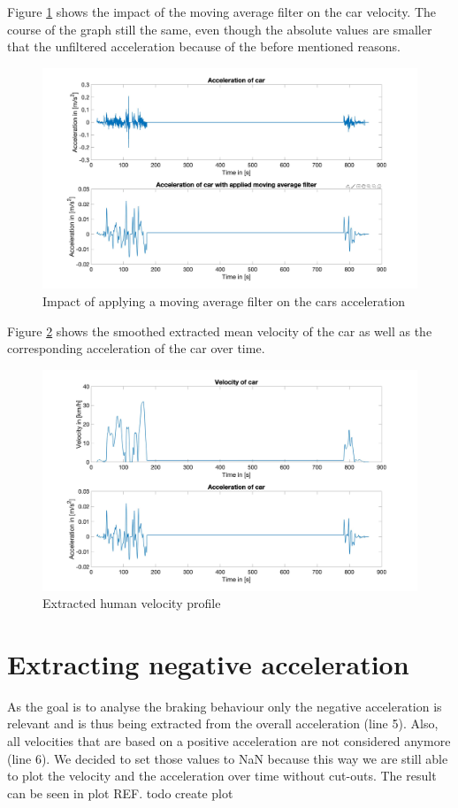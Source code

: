 Figure \ref{fig:D3_MovingAverage} shows the impact of the moving average filter on the car velocity.
The course of the graph still the same, even though the absolute values are smaller that the unfiltered acceleration because of the before mentioned reasons.
\begin{figure}[H]
\centering
\includegraphics[width=1\textwidth]{images/D3_moving_average.jpg}
\caption{Impact of applying a moving average filter on the cars acceleration}
\label{fig:D3_MovingAverage}
\end{figure}

Figure \ref{fig:D3_Fig_Overview} shows the smoothed extracted mean velocity of the car as well as the corresponding acceleration of the car over time.

\begin{figure}[H]
\centering
\includegraphics[width=1\textwidth]{images/D3_Fig_Overview.jpg}
\caption{Extracted human velocity profile}
\label{fig:D3_Fig_Overview}
\end{figure}


\section{Extracting negative acceleration}
As the goal is to analyse the braking behaviour only the negative acceleration is relevant and is thus being extracted from the overall acceleration (line 5). Also, all velocities that are based on a positive acceleration are not considered anymore (line 6). We decided to set those values to \ac{NaN} because this way we are still able to plot the velocity and the acceleration over time without cut-outs. The result can be seen in plot REF. todo create plot


